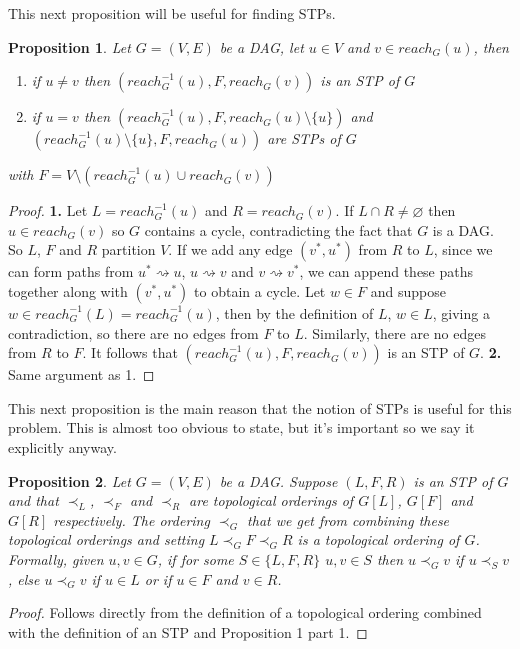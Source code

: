 \documentclass{article}
\newtheorem{proposition}{Proposition}
\begin{document}
This next proposition will be useful for finding STPs.
\begin{proposition}
Let $G=(V,E)$ be a DAG, let $u \in V$ and $v \in reach_{G}(u)$, then
\begin{enumerate}
\item if $u \neq v$ then $(reach_{G}^{-1}(u),F,reach_{G}(v))$ is an STP of $G$
\item if $u = v$ then $(reach_{G}^{-1}(u),F,reach_{G}(u) \setminus{\{u\}})$ and $(reach_{G}^{-1}(u) \setminus{\{u\}},F,reach_{G}(u))$ are STPs of $G$
\end{enumerate}
with $F=V \setminus (reach_{G}^{-1}(u) \cup reach_{G}(v))$
\end{proposition}

\begin{proof}
\textbf{1.} Let $L=reach_{G}^{-1}(u)$ and $R=reach_{G}(v)$. If $L \cap R \neq \varnothing$ then $u \in reach_{G}(v)$ so $G$ contains a cycle, contradicting the fact that $G$ is a DAG. So $L$, $F$ and $R$ partition $V$. If we add any edge $(v^{*},u^{*})$ from $R$ to $L$, since we can form paths from $u^{*} \rightsquigarrow u$, $u \rightsquigarrow v$ and $v \rightsquigarrow v^{*}$, we can append these paths together along with $(v^{*},u^{*})$ to obtain a cycle. Let $w \in F$ and suppose $w \in reach_{G}^{-1}(L) = reach_{G}^{-1}(u)$, then by the definition of $L$, $w \in L$, giving a contradiction, so there are no edges from $F$ to $L$. Similarly, there are no edges from $R$ to $F$. It follows that $(reach_{G}^{-1}(u),F,reach_{G}(v))$ is an STP of $G$.
\textbf{2.} Same argument as 1.
\end{proof}

This next proposition is the main reason that the notion of STPs is useful for this problem. This is almost too obvious to state, but it's important so we say it explicitly anyway.

\begin{proposition}
Let $G=(V,E)$ be a DAG. Suppose $(L,F,R)$ is an STP of $G$ and that $\prec_{L}$, $\prec_{F}$ and $\prec_{R}$ are topological orderings of $G[L]$, $G[F]$ and $G[R]$ respectively. The ordering $\prec_{G}$ that we get from combining these topological orderings and setting $L \prec_{G} F \prec_{G} R$ is a topological ordering of $G$. Formally, given $u, v \in G$, if for some $S \in \{ L,F,R\}$ $u,v \in S$ then $u \prec_{G} v$ if $u \prec_{S} v$, else $u \prec_{G} v$ if $u \in L$ or if $u \in F$ and $v \in R$. 
\end{proposition}

\begin{proof}
Follows directly from the definition of a topological ordering combined with the definition of an STP and Proposition 1 part 1.
\end{proof}
\end{document}
